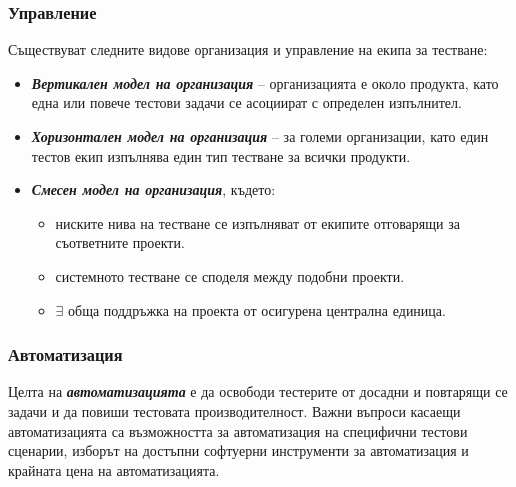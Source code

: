 \documentclass[fleqn,12pt]{article}
\begin{document}
\subsubsection{Управление}
Съществуват следните видове организация и управление на екипа за тестване:
\begin{itemize}
    \item \textbf{\textit{Вертикален модел на организация}} -- организацията е около продукта, като една или повече тестови задачи се асоциират с определен изпълнител.
    \item \textbf{\textit{Хоризонтален модел на организация}} -- за големи организации, като един тестов екип изпълнява един тип тестване за всички продукти.
    \item \textbf{\textit{Смесен модел на организация}}, където:
    \begin{itemize}
        \item ниските нива на тестване се изпълняват от екипите отговарящи за съответните проекти.
        \item системното тестване се споделя между подобни проекти.
        \item $\exists$ обща поддръжка на проекта от осигурена централна единица.
    \end{itemize}
\end{itemize}

\subsubsection{Автоматизация}

Целта на \textbf{\textit{автоматизацията}} е да освободи тестерите от досадни и повтарящи се задачи и да повиши тестовата производителност.
Важни въпроси касаещи автоматизацията са възможността за автоматизация на специфични тестови сценарии, изборът на достъпни софтуерни инструменти за автоматизация и крайната цена на автоматизацията.
\end{document}
